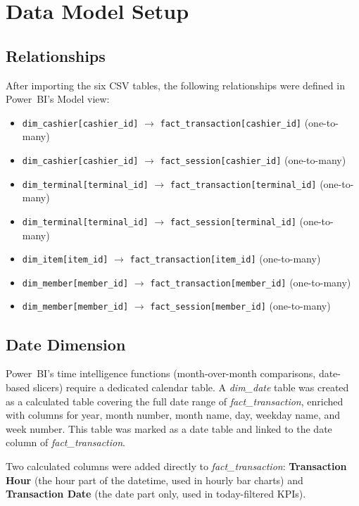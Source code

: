 \section{Data Model Setup}

\subsection{Relationships}

After importing the six CSV tables, the following relationships were defined in
Power~BI's Model view:

\begin{itemize}[noitemsep]
  \item \texttt{dim\_cashier[cashier\_id]} $\rightarrow$
        \texttt{fact\_transaction[cashier\_id]} (one-to-many)
  \item \texttt{dim\_cashier[cashier\_id]} $\rightarrow$
        \texttt{fact\_session[cashier\_id]} (one-to-many)
  \item \texttt{dim\_terminal[terminal\_id]} $\rightarrow$
        \texttt{fact\_transaction[terminal\_id]} (one-to-many)
  \item \texttt{dim\_terminal[terminal\_id]} $\rightarrow$
        \texttt{fact\_session[terminal\_id]} (one-to-many)
  \item \texttt{dim\_item[item\_id]} $\rightarrow$
        \texttt{fact\_transaction[item\_id]} (one-to-many)
  \item \texttt{dim\_member[member\_id]} $\rightarrow$
        \texttt{fact\_transaction[member\_id]} (one-to-many)
  \item \texttt{dim\_member[member\_id]} $\rightarrow$
        \texttt{fact\_session[member\_id]} (one-to-many)
\end{itemize}

\subsection{Date Dimension}

Power~BI's time intelligence functions (month-over-month comparisons, date-based
slicers) require a dedicated calendar table. A \textit{dim\_date} table was created
as a calculated table covering the full date range of \textit{fact\_transaction},
enriched with columns for year, month number, month name, day, weekday name, and
week number. This table was marked as a date table and linked to the date column of
\textit{fact\_transaction}.

Two calculated columns were added directly to \textit{fact\_transaction}:
\textbf{Transaction Hour} (the hour part of the datetime, used in hourly bar charts)
and \textbf{Transaction Date} (the date part only, used in today-filtered KPIs).


